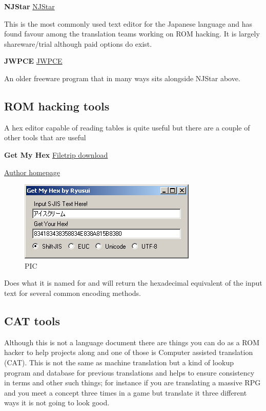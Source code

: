 \documentclass[
]{book}
\begin{document}
\textbf{NJStar} \href{http://www.njstar.com/cms/njstar-japanese-word-processor-download}{NJStar}

This is the most commonly used text editor for the Japanese language and has found favour among the translation teams working on ROM hacking. It is largely shareware/trial although paid options do exist.

\textbf{JWPCE} \href{http://www.physics.ucla.edu/~grosenth/japanese.html}{JWPCE}

An older freeware program that in many ways sits alongside NJStar above.

\hypertarget{rom-hacking-tools}{%
\subsection{ROM hacking tools}\label{rom-hacking-tools}}

A hex editor capable of reading tables is quite useful but there are a couple of other tools that are useful

\textbf{Get My Hex} \href{http://filetrip.net/pc-downloads/applications/download-getmyhex-1500-f29200.html}{Filetrip download}

\href{http://watercrown.info/}{Author homepage}

\begin{figure}
\centering
\includegraphics{images/134_home_fast6191_romhackingguide_unrenamed_files_and_original_borders_romhackingguidegetmyhex1.png}
\caption{PIC}
\end{figure}

Does what it is named for and will return the hexadecimal equivalent of the input text for several common encoding methods.

\hypertarget{cat-tools}{%
\subsection{CAT tools}\label{cat-tools}}

Although this is not a language document there are things you can do as a ROM hacker to help projects along and one of those is Computer assisted translation (CAT). This is not the same as machine translation but a kind of lookup program and database for previous translations and helps to ensure consistency in terms and other such things; for instance if you are translating a massive RPG and you meet a concept three times in a game but translate it three different ways it is not going to look good.
\end{document}
